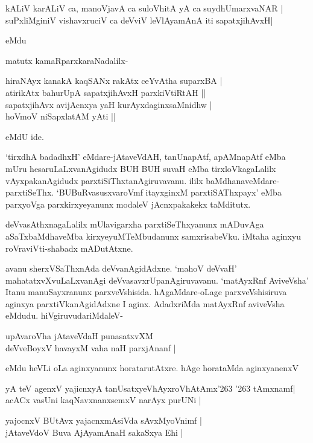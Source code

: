 \begin{shloka}
kALiV karALiV ca, manoVjavA ca suloVhitA yA ca suydhUmarxvaNAR |\\\label{116}
suPxliMginiV vishavxruciV ca deVviV leVlAyamAnA iti sapatxjihAvxH| \\
\end{shloka}
 eMdu

\noindent
matutx kamaRparxkaraNadalilx-

\begin{shloka}
hiraNAyx kanakA kaqSANx rakAtx ceYvAtha suparxBA |\\\label{116}
atirikAtx bahurUpA sapatxjihAvxH parxkiVtiRtAH ||\\
sapatxjihAvx avijAcnxya yaH kurAyxdaginxsaMnidhw |\\
hoVmoV niSapxlatAM yAti ||
\end{shloka}
eMdU ide.

`tirxdhA badadhxH' eMdare-jAtaveVdAH, tanUnapAtf, apAMnapAtf eMba mUru 
hesaruLaLxva\-nA\-gidudx BUH BUH suvaH eMba tirxloVkagaLalilx vAyxpakanAgidudx parxtiSiThxtanAgiruvavanu. ililx baMdhana\-veMdare\--parxtiSeThx. `BUBuRvasusxvaroVmf\label{116} itayxginxM parxtiSAThxpayx' eMba parxyoVga parxkirxyeyanunx modaleV jAcnxpakakekx taMditutx. 

deVvasAthxnagaLalilx mUlavigarxha parxtiSeThxyanunx mADuvAga aSaTxbaMdhaveMba kirxyeyuMTeMbu\-danunx samxrisabeVku. iMtaha aginxyu roVraviVti-shabadx mADutAtxne.

avanu sherxVSaThxnAda deVvanAgidAdxne. `mahoV deVvaH' 
mahatatxvXvuLaLxvanAgi deVvasavxrUpanAgiru\-vavanu. `matAyxRnf AviveVsha' Itanu manuSayxranunx parxveVshisida. hAgaMdare-oLage parxveVshisiruva aginxya parxtiVka\-nAgi\-dAdxne  I aginx. AdadxriMda matAyxRnf aviveVsha eMdudu. hiVgiruvudariMdaleV-

\begin{shloka}
upAvaroVha jAtaveVdaH punasatxvXM\\\label{116}
deVveBoyxV havayxM vaha naH parxjAnanf |
\end{shloka}

\noindent
eMdu heVLi oLa aginxyanunx horatarutAtxre. hAge horataMda aginxyanenxV 

\begin{shloka}
yA teV agenxV yajicnxyA tanUsatxyeVhAyxroVhAtAmx\char'263 \char'263 tAmxnamf|\\\label{116}
acACx vasUni kaqNavxnanxsemxV narAyx purUNi |
\end{shloka}

\begin{shloka}
yajocnxV BUtAvx yajacnxmAsiVda sAvxMyoVnimf |\\
jAtaveVdoV Buva AjAyamAnaH sakaSxya Ehi |
\end{shloka}

